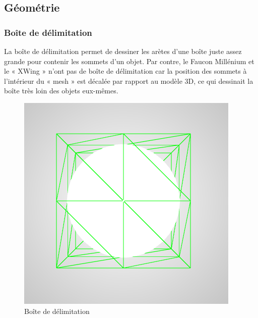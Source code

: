\subsection{Géométrie}
\subsubsection{Boîte de délimitation}
La boîte de délimitation permet de dessiner les arètes d’une boîte juste assez grande pour contenir les sommets d’un objet. Par contre, le Faucon Millénium et le « XWing » n’ont pas de boîte de délimitation car la position des sommets à l’intérieur du « mesh » est décalée par rapport au modèle 3D, ce qui dessinait la boîte très loin des objets eux-mêmes.
\begin{figure}[H]
    \centering
	\includegraphics[scale=0.4]{fig/delimitation.PNG}
	\caption{Boîte de délimitation}
	\label{fig:box}
\end{figure}


